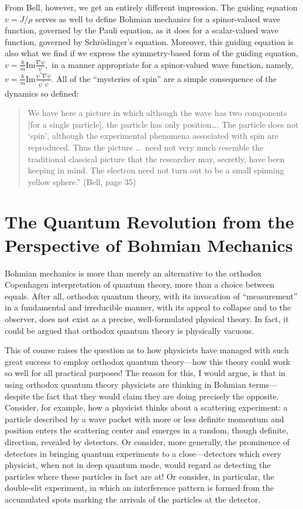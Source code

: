 \documentclass[12pt]{article}
\newcommand\bq{\begin{quotation}}
\newcommand\eq{\end{quotation}}
\begin{document}
{}From Bell, however, we get an entirely different impression. The guiding
equation $v=J/\rho$ serves as well to define Bohmian mechanics for a
spinor-valued wave function, governed by the Pauli equation, as it does for
a scalar-valued wave function, governed by Schr\"odinger's equation.
Moreover, this guiding equation is also what we find \cite{survey} if we
express the symmetry-based form of the guiding equation, $v=\frac
{\hbar}m\mbox {Im}\frac{\nabla \psi}{\psi},$ in a manner appropriate for a
spinor-valued wave function, namely, $v=\frac {\hbar}m\mbox
{Im}\frac{\psi^*\nabla
\psi}{\psi^*\psi}$. All of the ``mysteries of spin'' are a simple
consequence of the dynamics so defined:

\bq\noindent We have here a picture in which although the wave has two
components [for a single particle], the particle has only position\dots. The
particle does not `spin', although the experimental phenomena associated
with spin are reproduced. Thus the picture \dots\  need not very much resemble
the traditional classical picture that the researcher may, secretly, have
been keeping in mind. The electron need not turn out to be a small spinning
yellow sphere.'' (Bell, page 35)
\eq

\section*{The Quantum Revolution from the Perspective of Bohmian Mechanics}

Bohmian mechanics is more than merely an alternative to the orthodox
Copenhagen interpretation of quantum theory, more than a choice between
equals. After all, orthodox quantum theory, with its invocation of
``measurement'' in a fundamental and irreducible manner, with its appeal to
collapse and to the observer, does not exist as a precise, well-formulated
physical theory. In fact, it could be argued that orthodox quantum theory is
physically vacuous.

This of course raises the question as to how physicists have managed with
such great success to employ orthodox quantum theory---how this theory
could work so well for all practical purposes! The reason for this, I would
argue, is that in using orthodox quantum theory physicists  are thinking in
Bohmian terms---despite the fact that they would claim they are doing
precisely the opposite. Consider, for example, how a physicist thinks about
a scattering experiment: a particle described by a wave packet with more or
less definite momentum and position enters the scattering center and
emerges in a random, though definite, direction, revealed by detectors.  Or
consider, more generally, the prominence of detectors in bringing quantum
experiments to a close---detectors which every physicist, when not in deep
quantum mode, would regard as detecting the particles where these particles
in fact are at! Or consider, in particular, the double-slit experiment, in
which an interference pattern is formed from the accumulated spots marking
the arrivals of the particles at the detector.
\end{document}
